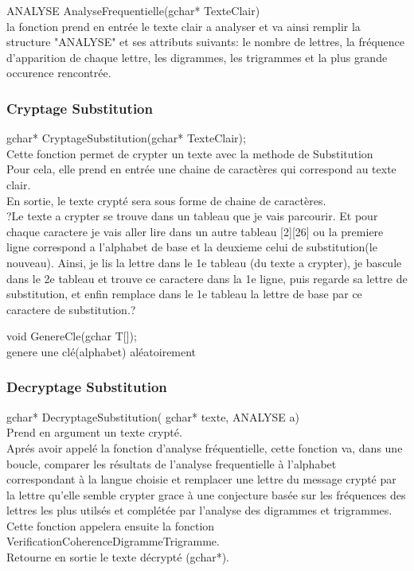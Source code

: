 \documentclass[a4]{article}
\begin{document}
		
		
	ANALYSE AnalyseFrequentielle(gchar* TexteClair)\\
		la fonction prend en entrée le texte clair a analyser et va ainsi remplir la structure "ANALYSE" et 
		ses attributs suivants:
		le nombre de lettres, la fréquence d'apparition de chaque lettre, les digrammes, les trigrammes
		et la plus grande occurence rencontrée.\\
		
	\subsubsection{Cryptage Substitution}
	gchar* CryptageSubstitution(gchar* TexteClair);\\
		Cette fonction permet de crypter un texte avec la methode de Substitution\\
		Pour cela, elle prend en entrée une chaine de caractères qui correspond au texte clair.\\
		En sortie, le texte crypté sera sous forme de chaine de caractères.\\
		?Le texte a crypter se trouve dans un tableau que je vais parcourir. Et pour chaque caractere je vais
		aller lire dans un autre tableau [2][26] ou la premiere ligne correspond a l'alphabet de base
		et la deuxieme celui de substitution(le nouveau). Ainsi, je lis la lettre dans le 1e tableau (du texte a 
		crypter), je bascule dans le 2e tableau et trouve ce caractere dans la 1e ligne, puis regarde sa lettre de substitution, et enfin remplace dans le 1e tableau la lettre de base par ce caractere de substitution.?
		
	void GenereCle(gchar T[]);\\
		genere une clé(alphabet) aléatoirement
	
	\subsubsection{Decryptage Substitution}
	gchar* DecryptageSubstitution( gchar* texte, ANALYSE a)\\
		Prend en argument un texte crypté.\\
		Aprés avoir appelé la fonction d'analyse fréquentielle, cette fonction va, 
		dans une boucle, comparer les résultats de l'analyse frequentielle à l'alphabet
		 correspondant à la langue choisie et remplacer une lettre du message crypté 
		 par la lettre qu'elle semble crypter grace à une conjecture basée sur les 
		 fréquences des lettres les plus utilsés et complétée par l'analyse des digrammes 
		 et trigrammes. Cette fonction appelera ensuite la fonction VerificationCoherenceDigrammeTrigramme.\\
		Retourne en sortie le texte décrypté (gchar*).\\
\end{document}
